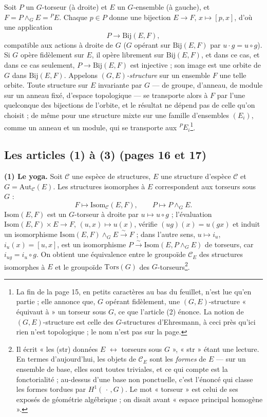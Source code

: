 \documentclass[11pt,a4paper]{article}
\begin{document}
Soit $P$ un $G$-torseur (à droite) et $E$ un $G$-ensemble (à gauche), et
$F = P \wedge_G E = {}^{P}E$. Chaque $p \in P$ donne une bijection $E \to F$,
$x \mapsto [p, x]$, d'où une application
\[
  P \to \mathrm{Bij}(E, F),
\]
compatible aux actions à droite de $G$ ($G$ opérant sur $\mathrm{Bij}(E, F)$
par $u \cdot g = u \circ g$). Si $G$ opère fidèlement sur $E$, il opère
librement sur $\mathrm{Bij}(E, F)$, et dans ce cas, et dans ce cas seulement,
$P \to \mathrm{Bij}(E, F)$ est injective ; son image est une orbite de $G$
dans $\mathrm{Bij}(E, F)$. Appelons \emph{$(G, E)$-structure} sur un ensemble
$F$ une telle orbite. Toute structure sur $E$ invariante par $G$ --- de groupe,
d'anneau, de module sur un anneau fixé, d'espace topologique --- se transporte
alors à $F$ par l'une quelconque des bijections de l'orbite, et le résultat ne
dépend pas de celle qu'on choisit ; de même pour une structure mixte sur une
famille d'ensembles $(E_i)$, comme un anneau et un module, qui se transporte
aux ${}^{P}E_i$\footnote{La fin de la page 15, en petits caractères au bas du
feuillet, n'est lue qu'en partie ; elle annonce que, $G$ opérant fidèlement,
une $(G,E)$-structure « équivaut à » un torseur sous $G$, ce que l'article (2)
énonce. La notion de $(G,E)$-structure est celle des $G$-structures
d'Ehresmann, à ceci près qu'ici rien n'est topologique ; le nom n'est pas sur
la page.}.

\subsection*{Les articles (1) à (3) (pages 16 et 17)}

\textbf{(1) Le yoga.} Soit $\mathcal{C}$ une espèce de structures, $E$ une
structure d'espèce $\mathcal{C}$ et $G = \mathrm{Aut}_{\mathcal{C}}(E)$. Les
structures isomorphes à $E$ correspondent aux torseurs sous $G$ :
\[
  F \longmapsto \mathrm{Isom}_{\mathcal{C}}(E, F), \qquad
  P \longmapsto P \wedge_G E .
\]
$\mathrm{Isom}(E, F)$ est un $G$-torseur à droite par $u \mapsto u \circ g$ ;
l'évaluation $\mathrm{Isom}(E, F) \times E \to F$, $(u, x) \mapsto u(x)$,
vérifie $(u g)(x) = u(g x)$ et induit un isomorphisme $\mathrm{Isom}(E, F)
\wedge_G E \xrightarrow{\sim} F$ ; dans l'autre sens, $u \mapsto i_u$, $i_u(x) =
[u, x]$, est un isomorphisme $P \xrightarrow{\sim} \mathrm{Isom}(E, P \wedge_G
E)$ de torseurs, car $i_{ug} = i_u \circ g$. On obtient une équivalence entre
le groupoïde $\mathcal{C}_E$ des structures isomorphes à $E$ et le groupoïde
$\mathrm{Tors}(G)$ des $G$-torseurs\footnote{Il écrit « les (str) données $E$
$\longleftrightarrow$ torseurs sous $G$ », « str » étant une lecture. En
termes d'aujourd'hui, les objets de $\mathcal{C}_E$ sont les \emph{formes} de
$E$ --- sur un ensemble de base, elles sont toutes triviales, et ce qui
compte est la fonctorialité ; au-dessus d'une base non ponctuelle, c'est
l'énoncé qui classe les formes tordues par $H^1(\,\cdot\,, G)$. Le mot
« torseur » est celui de ses exposés de géométrie algébrique ; on disait
avant « espace principal homogène ».}.
\end{document}
